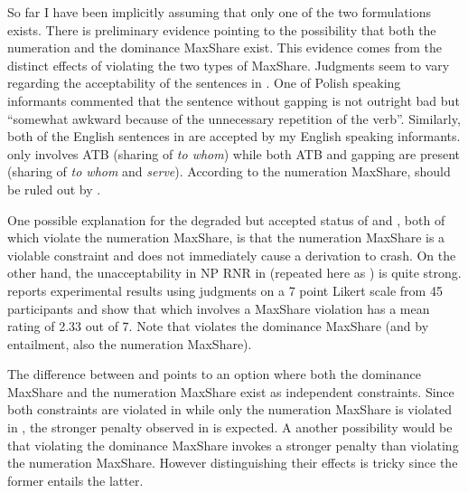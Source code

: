 \documentclass[output=paper]{langscibook}
\begin{document}

So far I have been implicitly assuming that only one of the two formulations exists. There is preliminary evidence pointing to the possibility that both the numeration and the dominance MaxShare exist. This evidence comes from the distinct effects of violating the two types of MaxShare. Judgments seem to vary regarding the acceptability of the sentences in . One of Polish speaking informants commented that the sentence without gapping is not outright bad but ``somewhat awkward because of the unnecessary repetition of the verb''. Similarly, both of the English sentences in  are accepted by my English speaking informants.  only involves ATB (sharing of \textit{to whom}) while both ATB and gapping are present  (sharing of \textit{to whom} and \textit{serve}). According to the numeration MaxShare,  should be ruled out by . 

\ea {}
	\label{shenex18}
	\z 
\z 
One possible explanation for the degraded but accepted status of  and , both of which violate the numeration MaxShare, is that the numeration MaxShare is a violable constraint and does not immediately cause a derivation to crash. On the other hand, the unacceptability in NP RNR in  (repeated here as ) is quite strong. \citet{Shen:2018a} reports experimental results using judgments on a 7 point Likert scale from 45 participants and show that  which involves a MaxShare violation has a mean rating of 2.33 out of 7. Note that  violates the dominance MaxShare (and by entailment, also the numeration MaxShare). 

\z

The difference between  and  points to an option where both the dominance MaxShare and the numeration MaxShare exist as independent constraints. Since both constraints are violated in  while only the numeration MaxShare is violated in , the stronger penalty observed in  is expected. A another possibility would be that violating the dominance MaxShare invokes a stronger penalty than violating the numeration MaxShare. However distinguishing their effects is tricky since the former entails the latter.
\end{document}
